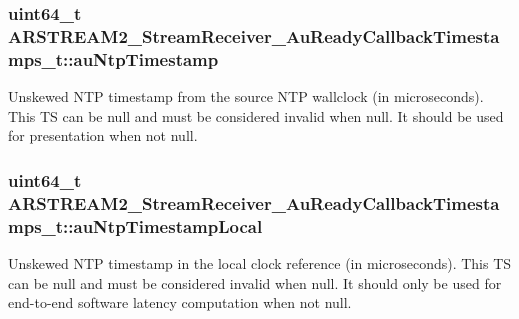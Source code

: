 \subsubsection[{\texorpdfstring{au\+Ntp\+Timestamp}{auNtpTimestamp}}]{\setlength{\rightskip}{0pt plus 5cm}uint64\+\_\+t A\+R\+S\+T\+R\+E\+A\+M2\+\_\+\+Stream\+Receiver\+\_\+\+Au\+Ready\+Callback\+Timestamps\+\_\+t\+::au\+Ntp\+Timestamp}\hypertarget{struct_a_r_s_t_r_e_a_m2___stream_receiver___au_ready_callback_timestamps__t_a76dda4142e3f6b87d7c804d16e485815}{}\label{struct_a_r_s_t_r_e_a_m2___stream_receiver___au_ready_callback_timestamps__t_a76dda4142e3f6b87d7c804d16e485815}
Unskewed N\+TP timestamp from the source N\+TP wallclock (in microseconds). This TS can be null and must be considered invalid when null. It should be used for presentation when not null. 
\subsubsection[{\texorpdfstring{au\+Ntp\+Timestamp\+Local}{auNtpTimestampLocal}}]{\setlength{\rightskip}{0pt plus 5cm}uint64\+\_\+t A\+R\+S\+T\+R\+E\+A\+M2\+\_\+\+Stream\+Receiver\+\_\+\+Au\+Ready\+Callback\+Timestamps\+\_\+t\+::au\+Ntp\+Timestamp\+Local}\hypertarget{struct_a_r_s_t_r_e_a_m2___stream_receiver___au_ready_callback_timestamps__t_a652da48ccaccde30e34d0cade10d7105}{}\label{struct_a_r_s_t_r_e_a_m2___stream_receiver___au_ready_callback_timestamps__t_a652da48ccaccde30e34d0cade10d7105}
Unskewed N\+TP timestamp in the local clock reference (in microseconds). This TS can be null and must be considered invalid when null. It should only be used for end-\/to-\/end software latency computation when not null. 
